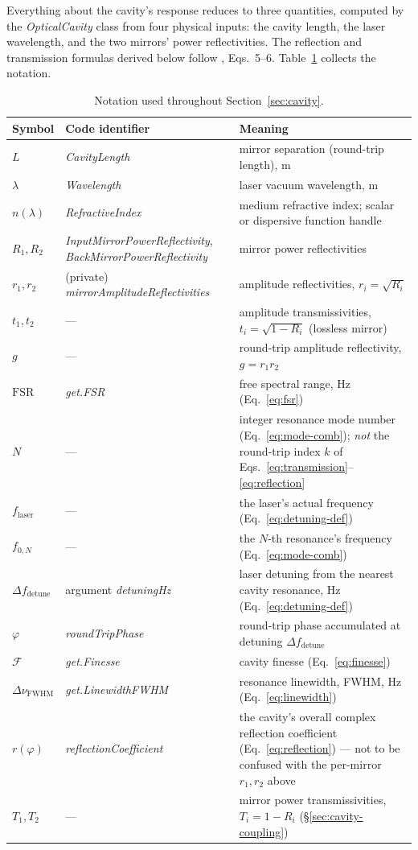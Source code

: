 \documentclass[9pt]{article}
\begin{document}
Everything about the cavity's response reduces to three quantities, computed
by the \textit{OpticalCavity} class from four physical inputs: the cavity
length, the laser wavelength, and the two mirrors' power reflectivities. The
reflection and transmission formulas derived below follow
\cite{black2001pdh}, Eqs.~5--6. Table~\ref{tab:cavity-glossary} collects the
notation.
\begin{table}[H]
\centering
\small
\begin{tabular}{@{}llp{6.8cm}@{}}
\toprule
Symbol & Code identifier & Meaning \\
\midrule
$L$ & \textit{CavityLength} & mirror separation (round-trip length), \si{\meter} \\
$\lambda$ & \textit{Wavelength} & laser vacuum wavelength, \si{\meter} \\
$n(\lambda)$ & \textit{RefractiveIndex} & medium refractive index; scalar or dispersive function handle \\
$R_1, R_2$ & \textit{InputMirrorPowerReflectivity}, \textit{BackMirrorPowerReflectivity} & mirror power reflectivities \\
$r_1, r_2$ & (private) \textit{mirrorAmplitudeReflectivities} & amplitude reflectivities, $r_i = \sqrt{R_i}$ \\
$t_1, t_2$ & --- & amplitude transmissivities, $t_i = \sqrt{1-R_i}$ (lossless mirror) \\
$g$ & --- & round-trip amplitude reflectivity, $g = r_1 r_2$ \\
$\mathrm{FSR}$ & \textit{get.FSR} & free spectral range, \si{\hertz} (Eq.~\eqref{eq:fsr}) \\
$N$ & --- & integer resonance mode number (Eq.~\eqref{eq:mode-comb}); \emph{not} the round-trip index $k$ of Eqs.~\eqref{eq:transmission}--\eqref{eq:reflection} \\
$f_{\mathrm{laser}}$ & --- & the laser's actual frequency (Eq.~\eqref{eq:detuning-def}) \\
$f_{0,N}$ & --- & the $N$-th resonance's frequency (Eq.~\eqref{eq:mode-comb}) \\
$\Delta f_{\mathrm{detune}}$ & argument \textit{detuningHz} & laser detuning from the nearest cavity resonance, \si{\hertz} (Eq.~\eqref{eq:detuning-def}) \\
$\varphi$ & \textit{roundTripPhase} & round-trip phase accumulated at detuning $\Delta f_{\mathrm{detune}}$ \\
$\mathcal{F}$ & \textit{get.Finesse} & cavity finesse (Eq.~\eqref{eq:finesse}) \\
$\Delta\nu_{\mathrm{FWHM}}$ & \textit{get.LinewidthFWHM} & resonance linewidth, FWHM, \si{\hertz} (Eq.~\eqref{eq:linewidth}) \\
$r(\varphi)$ & \textit{reflectionCoefficient} & the cavity's overall complex reflection coefficient (Eq.~\eqref{eq:reflection}) --- not to be confused with the per-mirror $r_1,r_2$ above \\
$T_1, T_2$ & --- & mirror power transmissivities, $T_i=1-R_i$ (\S\ref{sec:cavity-coupling}) \\
\bottomrule
\end{tabular}
\caption{Notation used throughout Section~\ref{sec:cavity}.}
\label{tab:cavity-glossary}
\end{table}
\end{document}
